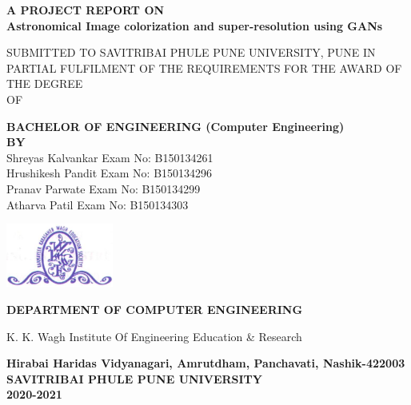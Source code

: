 \documentclass[oneside,a4paper,12pt]{report}
\begin{document}
\setlength{\parindent}{0mm}
\begin{center}
{\bfseries A  PROJECT REPORT ON \\}
 \vspace*{2\baselineskip}
{\bfseries \fontsize{16}{12} \selectfont Astronomical Image colorization and super-resolution using GANs \\ \vspace*{2\baselineskip}}
{\fontsize{12}{12} \selectfont SUBMITTED TO SAVITRIBAI PHULE PUNE UNIVERSITY, PUNE IN PARTIAL FULFILMENT OF THE REQUIREMENTS FOR THE AWARD OF THE DEGREE \\ 
OF

\vspace*{2\baselineskip}}
{\bfseries \fontsize{14}{12} \selectfont BACHELOR OF ENGINEERING (Computer
Engineering) \\
\vspace*{1\baselineskip}}
{\bfseries \fontsize{14}{12} \selectfont BY \\
\vspace*{1\baselineskip}}
Shreyas Kalvankar  \hspace{25 mm} Exam No: B150134261 \\
Hrushikesh Pandit \hspace{26 mm} Exam No: B150134296  \\
Pranav Parwate \hspace{31 mm} Exam No: B150134299 \\
Atharva Patil \hspace{35 mm} Exam No: B150134303\\
\vspace*{2\baselineskip}


\includegraphics[width=100pt]{collegelogo.png} \\
{\bfseries \fontsize{16}{12} \selectfont DEPARTMENT OF COMPUTER ENGINEERING \\ 
 \vspace*{1\baselineskip}

K. K. Wagh Institute Of Engineering Education \& Research\\ 
}
 \vspace*{1\baselineskip}
{\bfseries \fontsize{12}{12} \selectfont 
Hirabai Haridas Vidyanagari, Amrutdham, Panchavati, Nashik-422003 
\vspace*{1\baselineskip}}
{\bfseries \fontsize{12}{12} \selectfont 
SAVITRIBAI PHULE PUNE UNIVERSITY\\
2020-2021
}
\end{center}
\end{document}
